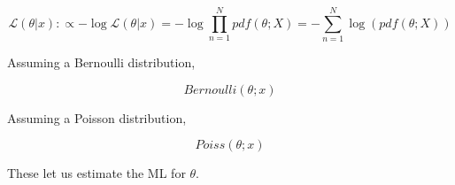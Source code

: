 \documentclass[mphil,deptreport,ianc]{infthesis} %
\begin{document}
\begin{equation}
    \mathcal{L}(\theta | x) :\propto - \log \mathcal{L}(\theta | x) = - \log \prod_{n=1}^N pdf(\theta; X) = - \sum_{n=1}^N \log (pdf(\theta; X))
\end{equation}

Assuming a Bernoulli distribution,

\begin{equation}
    Bernoulli(\theta; x)
\end{equation}

Assuming a Poisson distribution,

\begin{equation}
    Poiss(\theta; x)
\end{equation}

These let us estimate the ML for $\theta$.














\end{document}
